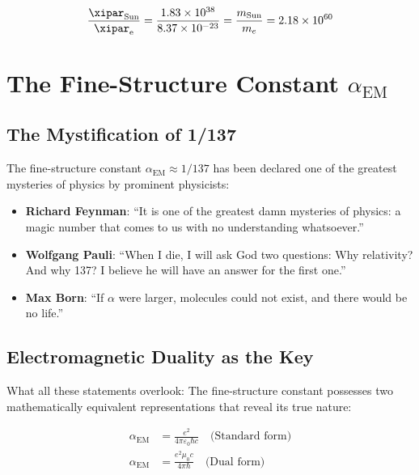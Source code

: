 	\begin{equation}
		\frac{\xipar_{\text{Sun}}}{\xipar_{\text{e}}} = \frac{1.83 \times 10^{38}}{8.37 \times 10^{-23}} = \frac{m_{\text{Sun}}}{m_e} = 2.18 \times 10^{60}
	\end{equation}
	
	
\section{The Fine-Structure Constant $\alpha_{\text{EM}}$}
\label{sec:alpha_em}

\subsection{The Mystification of 1/137}
\label{subsec:alpha_mystification}

The fine-structure constant $\alpha_{\text{EM}} \approx 1/137$ has been declared one of the greatest mysteries of physics by prominent physicists:

\begin{itemize}
	\item \textbf{Richard Feynman}: ``It is one of the greatest damn mysteries of physics: a magic number that comes to us with no understanding whatsoever.''
	\item \textbf{Wolfgang Pauli}: ``When I die, I will ask God two questions: Why relativity? And why 137? I believe he will have an answer for the first one.''
	\item \textbf{Max Born}: ``If $\alpha$ were larger, molecules could not exist, and there would be no life.''
\end{itemize}

\subsection{Electromagnetic Duality as the Key}
\label{subsec:electromagnetic_duality}

What all these statements overlook: The fine-structure constant possesses two mathematically equivalent representations that reveal its true nature:

\begin{align}
	\alpha_{\text{EM}} &= \frac{e^2}{4\pi\varepsilon_0\hbar c} \quad \text{(Standard form)} \label{eq:alpha_standard}\\
	\alpha_{\text{EM}} &= \frac{e^2 \mu_0 c}{4\pi \hbar} \quad \text{(Dual form)} \label{eq:alpha_dual}
\end{align}

